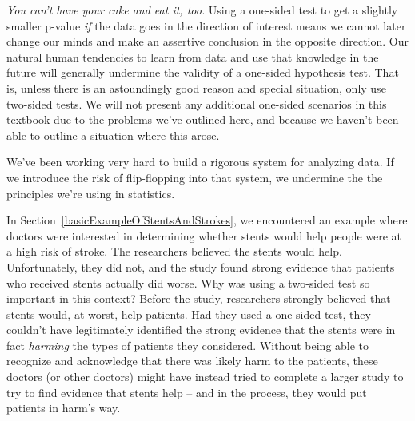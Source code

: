 \emph{You can't have your cake and eat it, too.}
Using a one-sided test to get a slightly smaller p-value
\emph{if} the data goes in the direction of interest means
we cannot later change our minds and make an assertive
conclusion in the opposite direction.
Our natural human tendencies to learn from data and use that
knowledge in the future will generally undermine the validity
of a one-sided hypothesis test. That is, unless there is
an astoundingly good reason and special situation,
only use two-sided tests.
We will not present any additional one-sided scenarios
in this textbook due to the problems we've outlined here,
and because we haven't been able to outline a situation
where this arose.

\begin{termBox}{
  We've been working very hard to build a rigorous
  system for analyzing data. If we introduce the risk
  of flip-flopping into that system, we undermine the
  the principles we're using in statistics.}
\end{termBox}

\begin{example}{
    In Section~\ref{basicExampleOfStentsAndStrokes},
    we encountered an example where doctors were interested
    in determining whether stents would help people were at
    a high risk of stroke.
    The researchers believed the stents would help.
    Unfortunately, they did not, and the study found strong
    evidence that patients who received stents actually did
    worse.
    Why was using a two-sided test so important in
    this context?}
  Before the study, researchers strongly believed that stents
  would, at worst, help patients. Had they used a one-sided
  test, they couldn't have legitimately identified the strong
  evidence that the stents were in fact \emph{harming} the
  types of patients they considered. Without being able to
  recognize and acknowledge that there was likely harm to
  the patients, these doctors (or other doctors) might have
  instead tried to complete a larger study to try to find
  evidence that stents help -- and in the process, they would
  put patients in harm's way.
\end{example}


